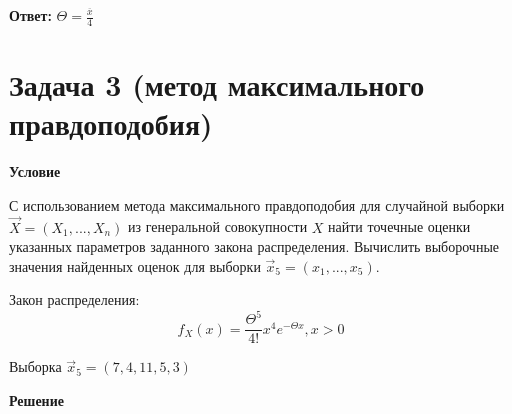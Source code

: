 \documentclass[a4paper,14pt]{extreport} %
\begin{document}
\hfill

\textbf{Ответ:} $ \Theta=\frac{\overline x}{4}$

\section{Задача 3 (метод максимального правдоподобия)}

\hfill

\textbf{Условие}

С использованием метода максимального правдоподобия для случайной выборки $\vec X = (X_1, . . . , X_n)$ из генеральной совокупности $X$ найти точечные оценки указанных параметров заданного закона распределения. Вычислить выборочные значения найденных оценок для выборки $\vec x_5 =  (x_1, . . . , x_5)$.

Закон распределения: $$f_X(x)=\frac{\Theta^5}{4!}x^4 e^{-\Theta x}, x>0$$

Выборка $\vec x_5 = (7,4,11,5,3)$ 

\hfill

\textbf{Решение}
\end{document}
